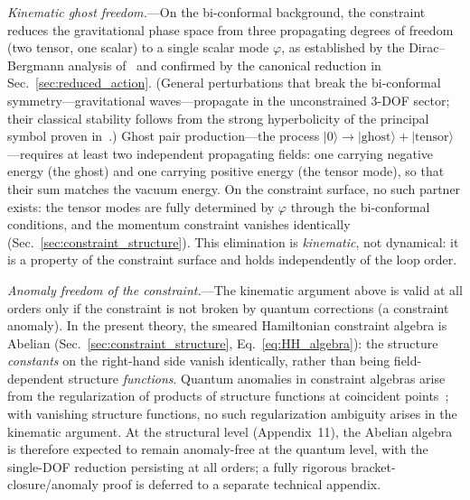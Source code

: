 \documentclass[aps,prd,onecolumn,superscriptaddress,nofootinbib,showpacs,12pt,notitlepage]{revtex4-2}
\begin{document}
\textit{Kinematic ghost freedom.}---On the bi-conformal
background, the constraint reduces the gravitational phase
space from three propagating degrees of freedom (two tensor,
one scalar) to a single scalar mode $\varphi$, as established
by the Dirac--Bergmann analysis of~\cite{Lotishvili2026} and
confirmed by the canonical reduction in
Sec.~\ref{sec:reduced_action}.  (General perturbations that
break the bi-conformal symmetry---gravitational waves---propagate
in the unconstrained 3-DOF sector; their classical stability
follows from the strong hyperbolicity of the principal symbol
proven in~\cite{Lotishvili2026}.)  Ghost pair
production---the process
$|0\rangle \to |\text{ghost}\rangle + |\text{tensor}\rangle$---requires
at least two independent propagating fields: one carrying
negative energy (the ghost) and one carrying positive energy
(the tensor mode), so that their sum matches the vacuum energy.
On the constraint surface, no such partner exists: the tensor
modes are fully determined by $\varphi$ through the bi-conformal
conditions, and the momentum constraint vanishes identically
(Sec.~\ref{sec:constraint_structure}).  This elimination is
\emph{kinematic}, not dynamical: it is a property of the
constraint surface and holds independently of the loop order.

\textit{Anomaly freedom of the constraint.}---The
kinematic argument above is valid at all orders only if the
constraint is not broken by quantum corrections (a constraint
anomaly).  In the present theory, the smeared Hamiltonian
constraint algebra is Abelian
(Sec.~\ref{sec:constraint_structure},
Eq.~\ref{eq:HH_algebra}): the structure \emph{constants}
on the right-hand side vanish identically, rather than being
field-dependent structure \emph{functions}.  Quantum
anomalies in constraint algebras arise from the regularization
of products of structure functions at coincident
points~\cite{DeWitt1967}; with vanishing structure functions,
no such regularization ambiguity arises in the kinematic argument.
At the structural level (Appendix~11), the Abelian algebra
is therefore expected to remain anomaly-free at the quantum
level, with the single-DOF reduction persisting at all orders;
a fully rigorous bracket-closure/anomaly proof is deferred to
a separate technical appendix.
\end{document}
